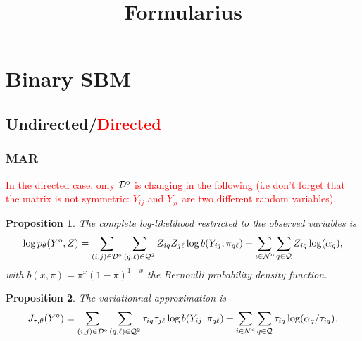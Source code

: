 \documentclass[10pt]{article}
\title{Formularius}
\author{}
\date{}
\newcommand{\1}{\mathds{1}}
\newcommand{\MA}{Y}
\newcommand{\MAO}{\MA^\text{\rm o}}
\newcommand{\block}{\mathcal{Q}}
\newcommand{\dyad}{\mathcal{D}}
\newcommand{\dyadO}{\dyad^\text{\rm o}}
\newcommand{\node}{\mathcal{N}}
\newcommand{\nodeO}{\node^\text{\rm o}}
\newtheorem{proposition}{Proposition}
\begin{document}
\maketitle
\tableofcontents

\section{Binary SBM}
\subsection{Undirected/\textcolor{red}{Directed}}

\subsubsection{MAR}
\textcolor{red}{In the directed case, only $\dyadO$ is changing in the following (i.e don't forget that the matrix is not symmetric: $\MA_{ij}$
and $\MA_{ji}$ are two different random variables).}
\begin{proposition}\label{prop:complete_loglik_sbm}      The      complete
  log-likelihood restricted to the observed variables is
  \begin{equation}
    \nonumber
    \log  p_{\theta}(\MAO,Z)=  \sum_{(i,j)\in  \dyadO}  \sum_{(q,\ell)
      \in\block^2}   Z_{iq}Z_{j\ell}\log   b(\MA_{ij},\pi_{q\ell})   +
    \sum_{i\in \nodeO}\sum_{q\in\block} Z_{iq}\log (\alpha_{q}),
  \end{equation}
  with $b(x,\pi)=\pi^{x}(1-\pi)^{1-x}$ the Bernoulli probability density function.
\end{proposition}

\begin{proposition} 
The variationnal approximation is
\begin{equation*}
  \label{eq:J_MAR}
  J_{\tau,\theta}(\MAO) =  \sum_{(i,j)\in  \dyadO}  \sum_{(q,\ell)\in\block^2}  \tau_{iq}\tau
  _{j\ell}\log       b(\MA_{ij},\pi_{q\ell})      +       \sum_{i\in\nodeO}\sum_{q\in\block} \tau _{iq}\log (\alpha_{q}/\tau_{iq}).
\end{equation*}
\end{proposition}
\end{document}
